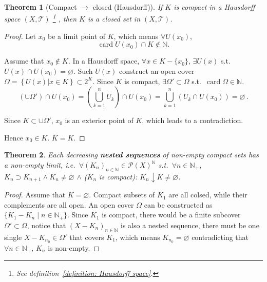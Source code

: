 \documentclass[openany]{book}
\theoremstyle{plain}
\newtheorem{theorem}{Theorem}[section] %
\theoremstyle{definition}
\DeclareMathOperator{\card}{card}
\begin{document}
\begin{theorem}[Compact $\to$ closed (Hausdorff)]\label{theorem: compact sets are closed in Hausdorff space}
	If $K$ is compact in a Hausdorff space $(X, \mathscr T)$%
		\footnote{See definition~\ref{definition: Hausdorff space}. }%
	, then $K$ is a closed set in $(X, \mathscr T)$.
\end{theorem}
\begin{proof}
	Let $x_0$ be a limit point of $K$, which means $\forall U(x_0)$, 
	\[
		\card U(x_0)\cap K \notin \mathbb{N}.
	\]

	Assume that $x_0 \notin K$. 
	In a Hausdorff space, $\forall x \in K - \{x_0\}$, $\exists U(x)$ s.t. $U(x)\cap U(x_0)=\varnothing$. 
	Such $U(x)$ construct an open cover $\varOmega=\left\{U(x)|x\in K \right\}\subset 2^K$. 
	Since $K$ is compact, $\exists \varOmega' \subset \varOmega$ s.t.\ $\card \Omega \in \mathbb{N}$. 
	\[
		\left(\cup\Omega'\right)
		\cap U(x_0)
		=
		\left(\bigcup_{k=1}^n{U_k}\right)
		\cap U(x_0)
		=
		\bigcup_{k=1}^n\left(
			U_k\cap U(x_0)
		\right)
		=
		\varnothing\,.
	\]

	Since $K\subset \cup \Omega'$, $x_0$ is an exterior point of $K$, which leads to a contradiction. 

	Hence $x_0 \in K$. $\overline K = K$.
\end{proof}


\begin{theorem}\label{theorem: compact nested sequences have non-empty limit}
	Each decreasing \emph{\textbf{nested sequences}} of non-empty compact sets has a non-empty limit, i.e.\ 
	$\forall (K_n)_{n \in \mathbb N} \in \mathscr P(X)^\mathbb N$ s.t.\ $\forall n \in \mathbb N_+$, $K_n \supset K_{n+1}\wedge K_n \neq \varnothing$ $\wedge$ ($K_n$ is compact): 
	$K_n \downarrow K \neq \varnothing$.
\end{theorem}
\begin{proof}
	Assume that $K = \varnothing$. 
	Compact subsets of $K_1$ are all colsed, while their complements are all open. An open cover $\varOmega$ can be constructed as $\{K_1 - K_n \mid n \in \mathbb N_+\}$. 
	Since $K_1$ is compact, there would be a finite subcover $\varOmega' \subset \varOmega$, notice that $(X - K_n)_{n \in \mathbb N}$ is also a nested sequence, there must be one single $X - K_{n_0} \in \varOmega'$ that covers $K_1$, which means $K_{n_0} = \varnothing$ contradicting that $\forall n \in \mathbb N_+$, $K_n$ is non-empty.
\end{proof}
\end{document}
